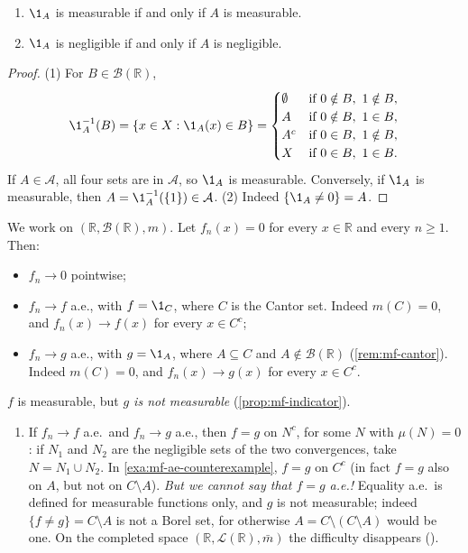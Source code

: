 \begin{proposition}\label{prop:mf-indicator}
\begin{enumerate}[label=(\arabic*)]
  \item $\1_A$ is measurable if and only if $A$ is measurable.
  \item $\1_A$ is negligible if and only if $A$ is negligible.
\end{enumerate}
\end{proposition}

\begin{proof}
(1) For $B\in\mathcal B(\mathbb R)$,
\[
  \1_A^{-1}(B)=\{x\in X:\1_A(x)\in B\}=
  \begin{cases}
    \emptyset & \text{if } 0\notin B,\ 1\notin B,\\
    A & \text{if } 0\notin B,\ 1\in B,\\
    A^c & \text{if } 0\in B,\ 1\notin B,\\
    X & \text{if } 0\in B,\ 1\in B.
  \end{cases}
\]
If $A\in\mathcal A$, all four sets are in $\mathcal A$, so $\1_A$ is measurable.
Conversely, if $\1_A$ is measurable, then $A=\1_A^{-1}(\{1\})\in\mathcal A$.
(2) Indeed $\{\1_A\ne0\}=A$.
\end{proof}

\begin{example}[Counterexample]\label{exa:mf-ae-counterexample}
We work on $(\mathbb R,\mathcal B(\mathbb R),m)$. Let $f_n(x)=0$ for every $x\in\mathbb R$ and
every $n\ge1$. Then:
\begin{itemize}
  \item $f_n\to0$ pointwise;
  \item $f_n\to f$ a.e., with $f=\1_C$, where $C$ is the Cantor set. Indeed $m(C)=0$, and
    $f_n(x)\to f(x)$ for every $x\in C^c$;
  \item $f_n\to g$ a.e., with $g=\1_A$, where $A\subseteq C$ and $A\notin\mathcal
    B(\mathbb R)$ (\cref{rem:mf-cantor}). Indeed $m(C)=0$, and $f_n(x)\to g(x)$ for every
    $x\in C^c$.
\end{itemize}
$f$ is measurable, but \emph{$g$ is not measurable} (\cref{prop:mf-indicator}).
\end{example}

\begin{remark}[continued]\label{rem:mf-ae-unique}
\begin{enumerate}[label=(\arabic*),start=3]
  \item If $f_n\to f$ a.e.\ and $f_n\to g$ a.e., then $f=g$ on $N^c$, for some $N$ with
    $\mu(N)=0$: if $N_1$ and $N_2$ are the negligible sets of the two convergences, take
    $N=N_1\cup N_2$. In \cref{exa:mf-ae-counterexample}, $f=g$ on $C^c$ (in fact $f=g$ also
    on $A$, but not on $C\setminus A$). \emph{But we cannot say that $f=g$ a.e.!} Equality
    a.e.\ is defined for measurable functions only, and $g$ is not measurable; indeed
    $\{f\ne g\}=C\setminus A$ is not a Borel set, for otherwise $A=C\setminus(C\setminus A)$
    would be one. On the completed space $(\mathbb R,\mathcal L(\mathbb R),\bar m)$ the
    difficulty disappears ().
\end{enumerate}
\end{remark}


